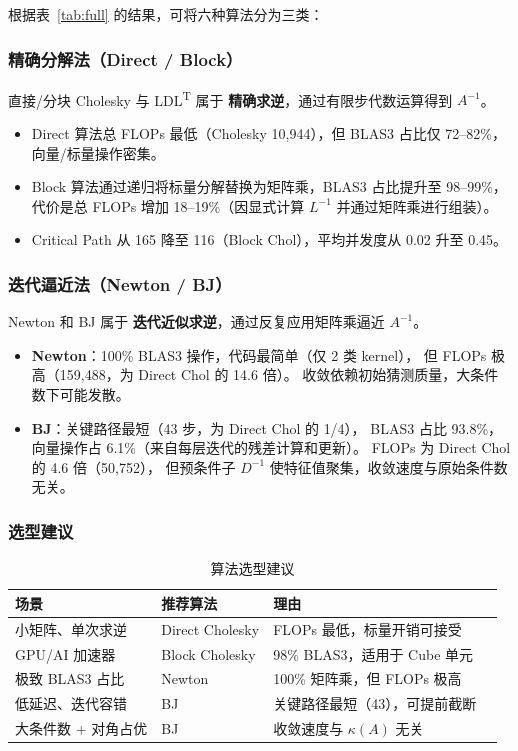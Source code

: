 \documentclass[11pt,a4paper]{ctexart}
\begin{document}
根据表~\ref{tab:full} 的结果，可将六种算法分为三类：

\subsubsection*{精确分解法（Direct / Block）}

直接/分块 Cholesky 与 LDL\textsuperscript{T} 属于 \textbf{精确求逆}，通过有限步代数运算得到 $A^{-1}$。
\begin{itemize}
    \item Direct 算法总 FLOPs 最低（Cholesky 10,944），但 BLAS3 占比仅 72--82\%，向量/标量操作密集。
    \item Block 算法通过递归将标量分解替换为矩阵乘，BLAS3 占比提升至 98--99\%，
          代价是总 FLOPs 增加 18--19\%（因显式计算 $L^{-1}$ 并通过矩阵乘进行组装）。
    \item Critical Path 从 165 降至 116（Block Chol），平均并发度从 0.02 升至 0.45。
\end{itemize}

\subsubsection*{迭代逼近法（Newton / BJ）}

Newton 和 BJ 属于 \textbf{迭代近似求逆}，通过反复应用矩阵乘逼近 $A^{-1}$。
\begin{itemize}
    \item \textbf{Newton}：100\% BLAS3 操作，代码最简单（仅 2 类 kernel），
          但 FLOPs 极高（159,488，为 Direct Chol 的 14.6 倍）。
          收敛依赖初始猜测质量，大条件数下可能发散。
    \item \textbf{BJ}：关键路径最短（43 步，为 Direct Chol 的 1/4），
          BLAS3 占比 93.8\%，向量操作占 6.1\%（来自每层迭代的残差计算和更新）。
          FLOPs 为 Direct Chol 的 4.6 倍（50,752），
          但预条件子 $D^{-1}$ 使特征值聚集，收敛速度与原始条件数无关。
\end{itemize}

\subsubsection*{选型建议}

\begin{table}[H]
\centering
\caption{算法选型建议}
\label{tab:choice}
\begin{tabular}{@{}lp{3cm}p{3cm}p{3cm}@{}}
\toprule
\textbf{场景} & \textbf{推荐算法} & \textbf{理由} \\
\midrule
小矩阵、单次求逆    & Direct Cholesky & FLOPs 最低，标量开销可接受 \\
GPU/AI 加速器       & Block Cholesky  & 98\% BLAS3，适用于 Cube 单元 \\
极致 BLAS3 占比     & Newton          & 100\% 矩阵乘，但 FLOPs 极高 \\
低延迟、迭代容错    & BJ              & 关键路径最短（43），可提前截断 \\
大条件数 + 对角占优 & BJ              & 收敛速度与 $\kappa(A)$ 无关 \\
\bottomrule
\end{tabular}
\end{table}
\end{document}
